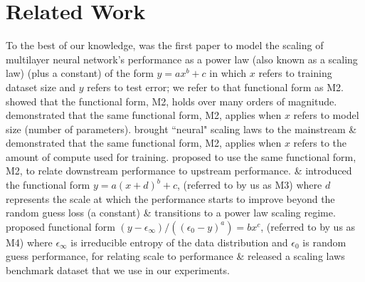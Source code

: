 \documentclass{article} %
\newcommand{\ir}[1]		{{ \textcolor{blue} { #1}}}
\begin{document}
\section{Related Work}
\vspace{-3.1mm}
To the best of our knowledge, \citet{cortes1994learning} was the first paper to model the scaling of multilayer neural network's performance as a power law (also known as a scaling law) (plus a constant)
of the form $y=ax^b + c$ in which $x$ refers to training dataset size and $y$ refers to test error; we refer to that functional form as M2. \citet{2017arXiv171200409H} showed that the functional form, M2, holds over many orders of magnitude. \citet{DBLP:journals/corr/abs-1909-12673} demonstrated  that the same functional form, M2, applies when $x$ refers to model size (number of parameters). \citet{icm2020arXiv200108361K} brought ``neural" scaling laws to the mainstream \& demonstrated that the same functional form, M2, applies when $x$ refers to the amount of compute used for training. \citet{abnar2021exploring} proposed to use the same functional form, M2, to relate downstream performance to upstream performance. \citet{DBLP:journals/corr/abs-2106-04560} \& \cite{bansal2022data} introduced the functional form $y=a(x+d)^b + c$, (referred to by us as M3) where  $d$ represents the scale at which the performance starts to improve beyond the random guess loss (a constant) \& transitions to a  power law scaling regime. \citet{Alabdulmohsi2022revisiting} proposed functional form $(y - \epsilon_{\infty}) / ((\epsilon_{0} - y)^a) = bx^c$, (referred to by us as M4) where  $\epsilon_{\infty}$ is irreducible entropy of the data distribution and $\epsilon_{0}$ is random guess performance, for relating scale to performance \& released a scaling laws benchmark dataset that we use in our experiments. %

\vspace{-0.65mm}

\end{document}
